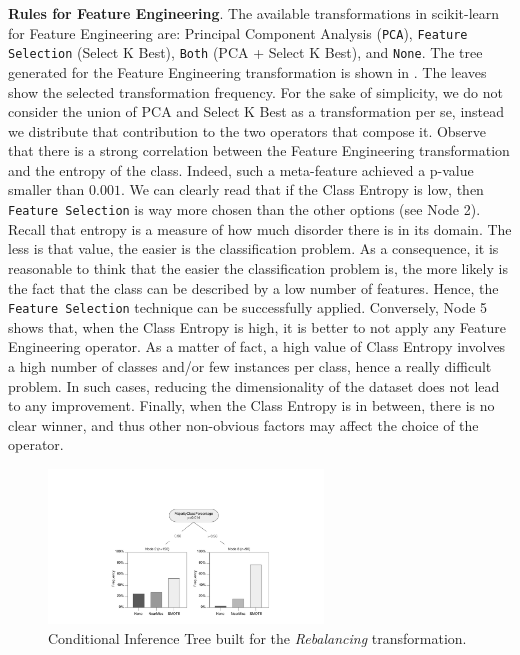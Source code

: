 \textbf{Rules for Feature Engineering}. The available transformations in scikit-learn for Feature Engineering are: Principal Component Analysis (\texttt{PCA}), \texttt{Feature Selection} (Select K Best), \texttt{Both} (PCA + Select K Best), and \texttt{None}.
The tree generated for the Feature Engineering transformation is shown in .
The leaves show the selected transformation frequency.
For the sake of simplicity, we do not consider the union of PCA and Select K Best as a transformation per se, instead we distribute that contribution to the two operators that compose it.
Observe that there is a strong correlation between the Feature Engineering transformation and the entropy of the class.
Indeed, such a meta-feature achieved a p-value smaller than $0.001$.
We can clearly read that if the Class Entropy is low, then \texttt{Feature Selection} is way more chosen than the other options (see Node 2).
Recall that entropy is a measure of how much disorder there is in its domain.
The less is that value, the easier is the classification problem.
As a consequence, it is reasonable to think that the easier the classification problem is, the more likely is the fact that the class can be described by a low number of features.
Hence, the \texttt{Feature Selection} technique can be successfully applied.
Conversely, Node 5 shows that, when the Class Entropy is high, it is better to not apply any Feature Engineering operator.
As a matter of fact, a high value of Class Entropy involves a high number of classes and/or few instances per class, hence a really difficult problem.
In such cases, reducing the dimensionality of the dataset does not lead to any improvement.
Finally, when the Class Entropy is in between, there is no clear winner, and thus other non-obvious factors may affect the choice of the operator.

\begin{figure}[!h]
	\centering
	\includegraphics[clip, trim=5.8cm 0.4cm 5.05cm 3.5cm,width=0.65\textwidth]{chapters/data-centric/supervised/img/tree-RE.pdf}
	\caption{Conditional Inference Tree built for the \textit{Rebalancing} transformation.}
	\label{effective-fig:features-meta-learning:rebalancing}
\end{figure}

